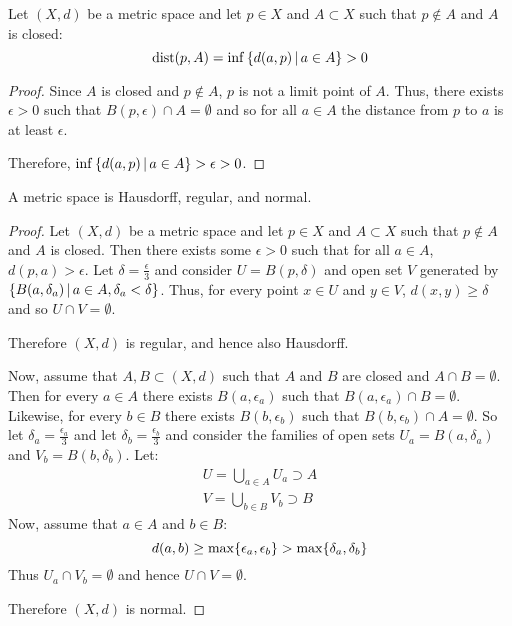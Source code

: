 \documentclass[letterpaper,12pt,fleqn]{article}
\newcommand{\e}{\epsilon}
\renewcommand{\d}{\delta}
\DeclareMathOperator{\dist}{dist}
\begin{document}
\begin{lemma}
  Let \((X,d)\) be a metric space and let \(p\in X\) and \(A\subset X\) such that \(p\notin A\) and \(A\) is
  closed:
  \[\dist(p,A)=\inf\setb{d(a,p)}{a\in A}>0\]
\end{lemma}

\begin{proof}
  Since \(A\) is closed and \(p\notin A\), \(p\) is not a limit point of \(A\).  Thus, there exists \(\e>0\) such
  that \(B(p,\e)\cap A=\emptyset\) and so for all \(a\in A\) the distance from \(p\) to \(a\) is at least \(\e\).

  Therefore, \(\inf\setb{d(a,p)}{a\in A}>\e>0\).
\end{proof}

\begin{theorem}[9.8]
  A metric space is Hausdorff, regular, and normal.
\end{theorem}

\begin{proof}
  Let \((X,d)\) be a metric space and let \(p\in X\) and \(A\subset X\) such that \(p\notin A\) and \(A\) is
  closed.  Then there exists some \(\e>0\) such that for all \(a\in A\), \(d(p,a)>\e\).  Let \(\d=\frac{\e}{3}\)
  and consider \(U=B(p,\d)\) and open set \(V\) generated by \(\setb{B(a,\d_a)}{a\in A,\d_a<\d}\).  Thus, for every
  point \(x\in U\) and \(y\in V\), \(d(x,y)\ge\d\) and so \(U\cap V=\emptyset\).

  Therefore \((X,d)\) is regular, and hence also Hausdorff.

  Now, assume that \(A,B\subset(X,d)\) such that \(A\) and \(B\) are closed and \(A\cap B=\emptyset\).  Then for
  every \(a\in A\) there exists \(B(a,\e_a)\) such that \(B(a,\e_a)\cap B=\emptyset\).  Likewise, for every \(b\in B\)
  there exists \(B(b,\e_b)\) such that \(B(b,\e_b)\cap A=\emptyset\).  So let \(\d_a=\frac{\e_a}{3}\) and let
  \(\d_b=\frac{\e_b}{3}\) and consider the families of open sets \(U_a=B(a,\d_a)\) and \(V_b=B(b,\d_b)\).  Let:
  \begin{align*}
    U=\bigcup_{a\in A}U_a\supset A \\
    V=\bigcup_{b\in B}V_b\supset B
  \end{align*}
  Now, assume that \(a\in A\) and \(b\in B\):
  \[d(a,b)\ge\max\set{\e_a,\e_b}>\max\set{\d_a,\d_b}\]
  Thus \(U_a\cap V_b=\emptyset\) and hence \(U\cap V=\emptyset\).

  Therefore \((X,d)\) is normal.
\end{proof}
\end{document}
